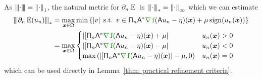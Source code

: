 \documentclass[smallextended]{svjour3}
\newcommand{\norm}[1]{{\left\lVert #1 \right\rVert}}
\newcommand{\Norm}[1]{{\left\vert\kern-0.25ex\left\vert\kern-0.25ex\left\vert #1 \right\vert\kern-0.25ex\right\vert\kern-0.25ex\right\vert}}
\newcommand{\op}[1]{\operatorname{#1}}
\newcommand{\1}{\F{1}}
\DeclareMathOperator{\st}{\;s.t.\;}
\DeclareMathOperator{\sign}{sign}
\newcommand*{\varf}[1]{%
	\IfEqCase{#1}{%
		{0}{u}%
		{1}{v}%
		{2}{w}%
	}[u#1]%
}
\newcommand*{\varx}[1]{%
	\IfEqCase{#1}{%
		{0}{x}%
		{1}{y}%
		{2}{z}%
		{3}{r}%
	}[x#1]%
}
\newcommand{\data}{\eta}
\newcommand{\Domain}{\Omega}\newcommand{\domain}{\omega}
\newcommand*{\vvarx}[1]{\vec{\varx{#1}}}
\newcommand{\edit}[2]{{\ifmmode\text{\color{red}\sout{\ensuremath{#1}}}\else {\color{red} \sout{#1}}\fi} {\color{darkgreen} #2}}
\begin{document}
	As $\Norm\cdot = \norm\cdot_1$, the natural metric for $\partial_n\op{E}$ is $\Norm\cdot_* = \norm\cdot_\infty$ which we can estimate
	\begin{align}
		\Norm{\partial_n \op{E}(\varf0_n)}_* &= \max_{\vvarx0\in\Domain}\min\left\{|\varf1| \st \varf1\in \tens{\Pi}_n\A^*\edit{}{\nabla\op{f}}(\A\varf0_n-\data)(\vvarx0) +  \mu\sign(\varf0_n(\vvarx0))\right\}
		\\&= \max_{\vvarx0\in\Domain}\begin{cases}
			|[\tens{\Pi}_n\A^*\edit{}{\nabla\op{f}}(\A\varf0_n-\data)(\vvarx0) + \mu| & \varf0_n(\vvarx0)>0
			\\|[\tens{\Pi}_n\A^*\edit{}{\nabla\op{f}}(\A\varf0_n-\data)(\vvarx0) - \mu| & \varf0_n(\vvarx0)<0
			\\\max\left(|[\tens{\Pi}_n\A^*\edit{}{\nabla\op{f}}(\A\varf0_n-\data)(\vvarx0)| - \mu, 0\right) & \varf0_n(\vvarx0) = 0
		\end{cases}
	\end{align}
	which can be used directly in Lemma~\ref{thm: practical refinement criteria}.
	
\end{document}
